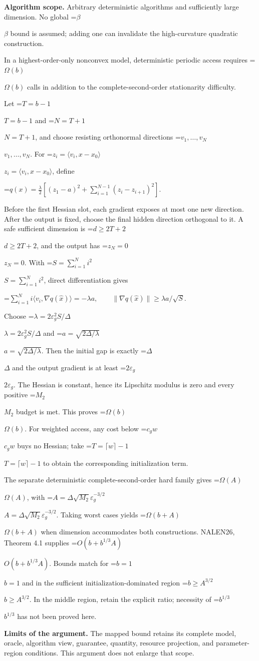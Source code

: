 \documentclass[10pt,a4paper]{article}
\newcommand{\AtlasMath}[1]{\par\begingroup\centering\setbox0=\hbox{$\displaystyle #1$}\ifdim\wd0>1.4\linewidth\typeout{ATLAS WIDE FORMULA: \the\wd0}\fi\ifdim\wd0>\linewidth\resizebox{\linewidth}{!}{\box0}\else\box0\fi\par\endgroup}
\newcommand{\AtlasInlineMath}[1]{\begingroup\setbox0=\hbox{$#1$}\ifdim\wd0>.4\linewidth\endgroup\AtlasMath{#1}\else\endgroup$#1$\fi}
\begin{document}
\textbf{Algorithm scope.} Arbitrary deterministic algorithms and sufficiently large dimension. No global \AtlasInlineMath{\beta} bound is assumed; adding one can invalidate the high-curvature quadratic construction.

In a highest-order-only nonconvex model, deterministic periodic access requires \AtlasInlineMath{\Omega(b)} calls in addition to the complete-second-order stationarity difficulty.

Let \AtlasInlineMath{T=b-1} and \AtlasInlineMath{N=T+1}, and choose resisting orthonormal directions \AtlasInlineMath{v_1,\ldots,v_N}. For \AtlasInlineMath{z_i=\langle v_i,x-x_0\rangle}, define

\AtlasMath{q(x)=\frac\lambda2[(z_1-a)^2+\sum_{i=1}^{N-1}(z_i-z_{i+1})^2].}

Before the first Hessian slot, each gradient exposes at most one new direction. After the output is fixed, choose the final hidden direction orthogonal to it. A safe sufficient dimension is \AtlasInlineMath{d\ge2T+2}, and the output has \AtlasInlineMath{z_N=0}. With \AtlasInlineMath{S=\sum_{i=1}^Ni^2}, direct differentiation gives

\AtlasMath{\sum_{i=1}^N i\langle v_i,\nabla q(\widehat x)\rangle=-\lambda a,\qquad
\|\nabla q(\widehat x)\|\ge\lambda a/\sqrt S.}

Choose \AtlasInlineMath{\lambda=2\varepsilon_g^2S/\Delta} and \AtlasInlineMath{a=\sqrt{2\Delta/\lambda}}. Then the initial gap is exactly \AtlasInlineMath{\Delta} and the output gradient is at least \AtlasInlineMath{2\varepsilon_g}. The Hessian is constant, hence its Lipschitz modulus is zero and every positive \AtlasInlineMath{M_2} budget is met. This proves \AtlasInlineMath{\Omega(b)}. For weighted access, any cost below \AtlasInlineMath{c_gw} buys no Hessian; take \AtlasInlineMath{T=\lceil w\rceil-1} to obtain the corresponding initialization term.

The separate deterministic complete-second-order hard family gives \AtlasInlineMath{\Omega(A)}, with \AtlasInlineMath{A=\Delta\sqrt{M_2}\varepsilon_g^{-3/2}}. Taking worst cases yields \AtlasInlineMath{\Omega(b+A)} when dimension accommodates both constructions. NALEN26, Theorem 4.1 supplies \AtlasInlineMath{O(b+b^{1/3}A)}. Bounds match for \AtlasInlineMath{b=1} and in the sufficient initialization-dominated region \AtlasInlineMath{b\ge A^{3/2}}. In the middle region, retain the explicit ratio; necessity of \AtlasInlineMath{b^{1/3}} has not been proved here.

\textbf{Limits of the argument.} The mapped bound retains its complete model, oracle, algorithm view, guarantee, quantity, resource projection, and parameter-region conditions. This argument does not enlarge that scope.
\end{document}
